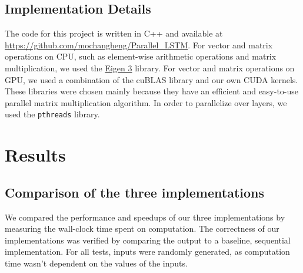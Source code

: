 \documentclass[12pt]{article}
\begin{document}


\subsection{Implementation Details}
The code for this project is written in C++ and available at \url{https://github.com/mochangheng/Parallel_LSTM}.
For vector and matrix operations on CPU, such as element-wise arithmetic operations and matrix multiplication, we used the \href{https://eigen.tuxfamily.org}{Eigen 3} library.
For vector and matrix operations on GPU, we used a combination of the cuBLAS library and our own CUDA kernels.
These libraries were chosen mainly because they have an efficient and easy-to-use parallel matrix multiplication algorithm. 
In order to parallelize over layers, we used the \verb|pthreads| library.


\section{Results}


\subsection{Comparison of the three implementations}
We compared the performance and speedups of our three implementations by measuring the  wall-clock time spent on computation.
The correctness of our implementations was verified by comparing the output to a baseline, sequential implementation.
For all tests, inputs were randomly generated, as computation time wasn't dependent on the values of the inputs.
\end{document}

